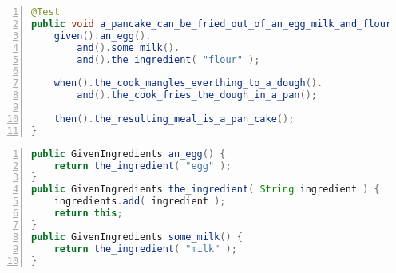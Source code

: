 \documentclass[00_Praxissemesterbericht.tex]{subfiles}
\begin{document}
\begin{lstlisting}[language=java, frame=single, caption = JGiven Java Beispiel (Quelle{\cite{JGiven}}), captionpos=t, breaklines=true, showstringspaces=false, numbers = left, tabsize = 2, label=lst:JGIVEN_JAVA]
@Test
public void a_pancake_can_be_fried_out_of_an_egg_milk_and_flour() {
    given().an_egg().
        and().some_milk().
        and().the_ingredient( "flour" );

    when().the_cook_mangles_everthing_to_a_dough().
        and().the_cook_fries_the_dough_in_a_pan();

    then().the_resulting_meal_is_a_pan_cake();
}
\end{lstlisting}

\begin{lstlisting}[language=java, frame=single, caption = JGiven Steps Beispiel (Quelle{\cite{JGiven_Github}}), captionpos=t, breaklines=true, showstringspaces=false, numbers = left, tabsize = 2, label=lst:JGIVEN_JAVA_STEPS]
public GivenIngredients an_egg() {
	return the_ingredient( "egg" );
}
public GivenIngredients the_ingredient( String ingredient ) {
	ingredients.add( ingredient );
	return this;
}
public GivenIngredients some_milk() {
	return the_ingredient( "milk" );
}
\end{lstlisting}

\clearpage
\end{document}
